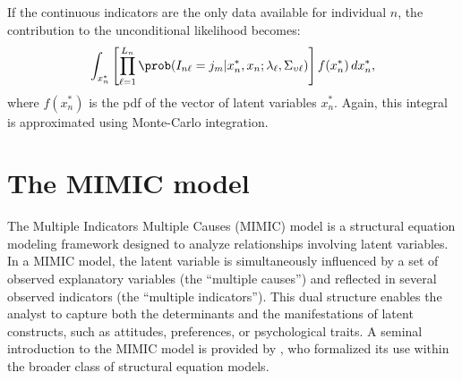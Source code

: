 \documentclass[12pt,a4paper]{article}
\begin{document}
If the continuous indicators are the only data available for individual \( n \), the contribution to the unconditional likelihood becomes:
\begin{equation}
\int_{x_n^*} \left[ \prod_{\ell=1}^{L_n} \prob(I_{n\ell} = j_m| x^*_n, x_n ; \lambda_\ell, \Sigma_{\upsilon \ell})
\right] f(x_n^*) \, dx_n^*,
\end{equation}
where \( f(x_n^*) \) is the pdf of the vector of latent variables \( x_n^* \).
Again, this integral is approximated using Monte-Carlo integration.


\section{The MIMIC model}

The Multiple Indicators Multiple Causes (MIMIC) model is a structural
equation modeling framework designed to analyze relationships
involving latent variables. In a MIMIC model, the latent variable is
simultaneously influenced by a set of observed explanatory variables
(the ``multiple causes'') and reflected in several observed indicators
(the ``multiple indicators''). This dual structure enables the analyst
to capture both the determinants and the manifestations of latent
constructs, such as attitudes, preferences, or psychological traits.
A seminal introduction to the MIMIC model is provided by
, who formalized its use within the
broader class of structural equation models.
\end{document}
